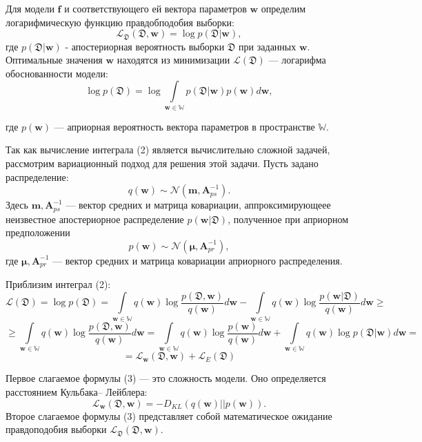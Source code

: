 \documentclass[12pt, twoside]{article}
\begin{document}
Для модели $\mathbf{f}$ и соответствующего ей вектора параметров $\mathbf{w}$ определим логарифмическую функцию правдобподобия выборки:
\begin{equation}
   \mathcal{L}_\mathfrak{D}(\mathfrak{D}, \mathbf{w}) = \log p(\mathfrak{D}|\mathbf{w}),
\end{equation}
где $p(\mathfrak{D}| \mathbf{w})$ - апостериорная вероятность выборки $\mathfrak{D}$ при заданных $\mathbf{w}$.
Оптимальные значения $\mathbf{w}$ находятся из минимизации $\mathcal{L}(\mathfrak{D})$ --- логарифма обоснованности модели:
\begin{equation}
     \log p(\mathfrak{D}) = \log \int\limits_{\mathbf{w}\in \mathbb{W}} p(\mathfrak{D}|\mathbf{w})p(\mathbf{w}) d\mathbf{w},
\end{equation}

где $p(\mathbf{w})$ --- априорная вероятность вектора параметров в пространстве $\mathbb{W}$.

Так как вычисление интеграла (2) является вычислительно сложной задачей, рассмотрим вариационный подход для решения этой задачи. Пусть задано распределение:
\[q(\mathbf{w}) \sim \mathcal{N} (\mathbf{m},\mathbf{A}_{ps}^{-1}).\]
Здесь $\mathbf{m}, \mathbf{A}_{ps}^{-1}$ --- вектор средних и матрица ковариации, аппроксимирующеее неизвестное апостериорное распределение $p(\mathbf{w}| \mathfrak{D})$, полученное при априорном предположении
\[p(\mathbf{w}) \sim \mathcal{N} (\mathbf{\mu}, \mathbf{A}_{pr}^{-1}),\]
где $\mathbf{\mu}, \mathbf{A}_{pr}^{-1}$ --- вектор средних и матрица ковариации априорного распределения. 


Приблизим интеграл (2):
\[  \mathcal{L}(\mathfrak{D}) = \log p(\mathfrak{D}) = \int\limits_{\mathbf{w}\in \mathbb{W}} q(\mathbf{w}) \log \frac{p(\mathfrak{D}, \mathbf{w})}{q(\mathbf{w})}d\mathbf{w} - \int\limits_{\mathbf{w}\in \mathbb{W}} q(\mathbf{w}) \log \frac{p(\mathbf{w}|\mathfrak{D})}{q(\mathbf{w})}d\mathbf{w} \geq \]
\[ \geq \int\limits_{\mathbf{w}\in \mathbb{W}} q(\mathbf{w}) \log \frac{p(\mathfrak{D}, \mathbf{w})}{q(\mathbf{w})}d\mathbf{w} = \int\limits_{\mathbf{w}\in \mathbb{W}} q(\mathbf{w}) \log \frac{p(\mathbf{w})}{q(\mathbf{w})}d\mathbf{w} + \int\limits_{\mathbf{w}\in \mathbb{W}} q(\mathbf{w}) \log p(\mathfrak{D}|\mathbf{w})d\mathbf{w} = \]
\begin{equation}
     = \mathcal{L}_{\mathbf{w}}(\mathfrak{D}, \mathbf{w}) + \mathcal{L}_E (\mathfrak{D})
\end{equation}


Первое слагаемое формулы (3) --- это сложность модели. Оно определяется расстоянием Кульбака–
Лейблера:
\[\mathcal{L}_{\mathbf{w}} (\mathfrak{D}, \mathbf{w}) = - D_{KL} (q(\mathbf{w})||p(\mathbf{w})).\]
Второе слагаемое формулы (3) представляет собой математическое ожидание правдоподобия выборки $\mathcal{L}_{\mathfrak{D}}(\mathfrak{D}, \mathbf{w})$.  
\end{document}
